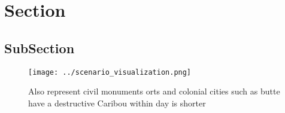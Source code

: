 \documentclass[a4paper]{article}
\begin{document}
\section{Section}

\subsection{SubSection}

\begin{figure}
\centering
\texttt{[image: ../scenario\_visualization.png]}
\caption{Also represent civil monuments orts and colonial cities such as butte have a destructive Caribou within day is shorter 
}
\end{figure}
 
\end{document}

